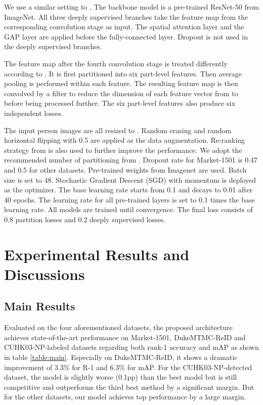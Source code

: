 \documentclass[10pt,twocolumn,letterpaper]{article}
\newcommand{\myparagraph}[1]{\vspace{3pt}\noindent{\bf #1}}
\begin{document}
\myparagraph{Implementation Details.}We use a similar setting to \cite{pcb}. The backbone model is a pre-trained ResNet-50 from ImageNet. All three deeply supervised branches take the feature map from the corresponding convolution stage as  input. The spatial attention layer and the GAP layer are applied before the fully-connected layer. Dropout is not used in the deeply supervised branches.

The feature map after the fourth convolution stage is treated differently according to \cite{pcb}. It is first partitioned into six part-level features. Then average pooling is performed within each feature. The resulting feature map is then convolved by a  filter to reduce the dimension of each feature vector from  to  before being processed further. The six part-level features also produce six independent losses.

The input person images are all resized to . Random erasing \cite{random_erase} and random horizontal flipping with 0.5 are applied as the data augmentation. Re-ranking strategy from \cite{reranking} is also used to further improve the performance. We adopt the recommended number of partitioning from \cite{pcb}. Dropout rate for Market-1501 is 0.47 and 0.5 for other datasets.
Pre-trained weights from Imagenet are used. Batch size is set to 48. Stochastic Gradient Descent (SGD) with momentum is deployed as the optimizer. The base learning rate starts from 0.1 and decays to 0.01 after 40 epochs. The learning rate for all  pre-trained layers is set to 0.1 times the base learning rate. All  models are trained until convergence. The final loss consists of 0.8 partition losses and 0.2 deeply supervised losses.




\section{Experimental Results and Discussions}
\subsection{Main Results}
Evaluated on the four aforementioned datasets, the proposed architecture achieves state-of-the-art performance on Market-1501, DukeMTMC-ReID and CUHK03-NP-labeled datasets regarding both rank-1 accuracy and mAP as shown in table \ref{table:main}. Especially on DukeMTMC-ReID, it shows a dramatic improvement of 3.3\% for R-1 and 6.3\% for mAP. For the CUHK03-NP-detected dataset, the model is slightly worse (0.1pp) than the best model but is still competitive and outperforms the third best method by a significant margin.
But for the other datasets, our model achieves top performance by a large margin.
\end{document}
